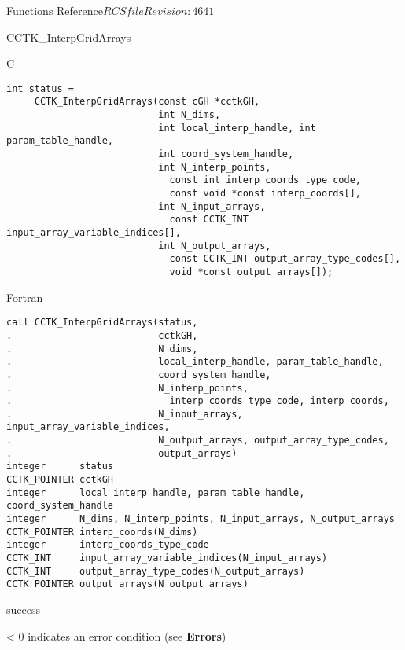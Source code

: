 \begin{cactuspart}{ Functions Reference}{$RCSfile$}{$Revision: 4641 $}
\begin{FunctionDescription}{CCTK\_InterpGridArrays}
\begin{SynopsisSection}
\begin{Synopsis}{C}
\begin{verbatim}
int status =
     CCTK_InterpGridArrays(const cGH *cctkGH,
                           int N_dims,
                           int local_interp_handle, int param_table_handle,
                           int coord_system_handle,
                           int N_interp_points,
                             const int interp_coords_type_code,
                             const void *const interp_coords[],
                           int N_input_arrays,
                             const CCTK_INT input_array_variable_indices[],
                           int N_output_arrays,
                             const CCTK_INT output_array_type_codes[],
                             void *const output_arrays[]);
\end{verbatim}
\end{Synopsis}
\begin{Synopsis}{Fortran}
\begin{verbatim}
call CCTK_InterpGridArrays(status,
.                          cctkGH,
.                          N_dims,
.                          local_interp_handle, param_table_handle,
.                          coord_system_handle,
.                          N_interp_points,
.                            interp_coords_type_code, interp_coords,
.                          N_input_arrays, input_array_variable_indices,
.                          N_output_arrays, output_array_type_codes,
.                          output_arrays)
integer      status
CCTK_POINTER cctkGH
integer      local_interp_handle, param_table_handle, coord_system_handle
integer      N_dims, N_interp_points, N_input_arrays, N_output_arrays
CCTK_POINTER interp_coords(N_dims)
integer      interp_coords_type_code
CCTK_INT     input_array_variable_indices(N_input_arrays)
CCTK_INT     output_array_type_codes(N_output_arrays)
CCTK_POINTER output_arrays(N_output_arrays)
\end{verbatim}
\end{Synopsis}
\end{SynopsisSection}

\begin{ResultSection}
\begin{Result}{0} success \end{Result}
\begin{Result}{< 0} indicates an error condition (see {\bf Errors}) \end{Result}
\end{ResultSection}


\end{FunctionDescription}
\end{cactuspart}
